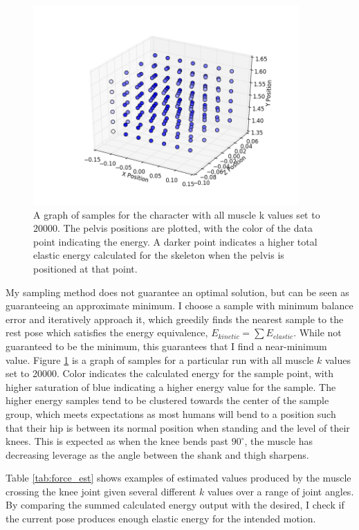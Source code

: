 \begin{figure}[ht]
	\centering
	\includegraphics[width=4in]{images/K200000_global_dense.png}
	\caption[A plot of a sample field for energy based simulation]{A graph of samples for the character with all muscle k values set to $20000$.  The pelvis positions are plotted, with the color of the data point indicating the energy.  A darker point indicates a higher total elastic energy calculated for the skeleton when the pelvis is positioned at that point.}
	\label{fig:energy_samples}
\end{figure}

My sampling method does not guarantee an optimal solution, but can be seen as guaranteeing an approximate minimum.  I choose a sample with minimum balance error and iteratively approach it, which greedily finds the nearest sample to the rest pose which satisfies the energy equivalence, $E_{kinetic} = \displaystyle\sum E_{elastic}$.  While not guaranteed to be the minimum, this guarantees that I find a near-minimum value.  Figure \ref{fig:energy_samples} is a graph of samples for a particular run with all muscle $k$ values set to 20000.  Color indicates the calculated energy for the sample point, with higher saturation of blue indicating a higher energy value for the sample.  The higher energy samples tend to be clustered towards the center of the sample group, which meets expectations as most humans will bend to a position such that their hip is between its normal position when standing and the level of their knees.  This is expected as when the knee bends past $90^\circ$, the muscle has decreasing leverage as the angle between the shank and thigh sharpens.

Table \ref{tab:force_est} shows examples of estimated values produced by the muscle crossing the knee joint given several different $k$ values over a range of joint angles.  By comparing the summed calculated energy output with the desired, I check if the current pose produces enough elastic energy for the intended motion.

